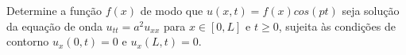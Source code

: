 \linespread{1.5}

Determine a função $f(x)$ de modo que $u(x,t) = f(x)cos(pt)$ seja solução da equação de onda $u_{tt} = a^2u_{xx}$ para $x\in[0, L]$ e $t\geq0$, sujeita às condições de contorno $u_x(0,t) = 0$ e $u_x(L,t) = 0$.